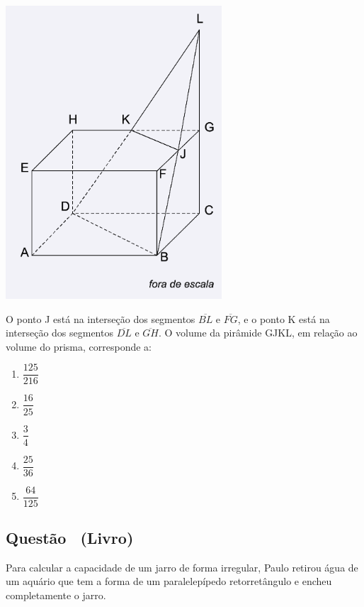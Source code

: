 \documentclass[12pt]{article}
\newcounter{questao}
\newcommand{\novaquestao}[1]{%
  \stepcounter{questao}%
  \subsection*{Questão \thequestao\ (#1)}%
}
\begin{document}
\begin{multicols}{2}
            \begin{center}
                \includegraphics[scale=0.7]{einstein_2025.png}
            \end{center} O ponto J está na interseção dos segmentos $\overline{BL}$ e $\overline{FG}$, e o ponto K está na interseção dos segmentos $\overline{DL}$ e $\overline{GH}$. O volume da pirâmide GJKL, em relação ao volume do prisma, corresponde a:

         \begin{enumerate}[label=(\alph*), noitemsep]
            \item $\dfrac{125}{216}$ \\  %
            \item $\dfrac{16}{25}$ \\
            \item $\dfrac{3}{4}$ \\
            \item $\dfrac{25}{36}$ \\
            \item $\dfrac{64}{125}$ 
        \end{enumerate}

        \novaquestao{Livro}

            Para calcular a capacidade de um jarro de forma irregular, Paulo retirou água de um aquário que tem a forma de um paralelepípedo retorretângulo e encheu completamente o jarro.


\end{multicols}
\end{document}
